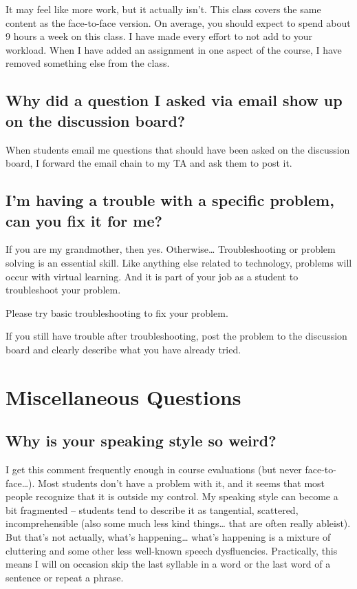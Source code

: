 \documentclass[
]{book}
\begin{document}
It may feel like more work, but it actually isn't. This class covers the same content as the face-to-face version. On average, you should expect to spend about 9 hours a week on this class. I have made every effort to not add to your workload. When I have added an assignment in one aspect of the course, I have removed something else from the class.

\subsection{Why did a question I asked via email show up on the discussion board?}\label{why-did-a-question-i-asked-via-email-show-up-on-the-discussion-board}

When students email me questions that should have been asked on the discussion board, I forward the email chain to my TA and ask them to post it.

\subsection{I'm having a trouble with a specific problem, can you fix it for me?}\label{im-having-a-trouble-with-a-specific-problem-can-you-fix-it-for-me}

If you are my grandmother, then yes. Otherwise\ldots{} Troubleshooting or problem solving is an essential skill. Like anything else related to technology, problems will occur with virtual learning. And it is part of your job as a student to troubleshoot your problem.

Please try basic troubleshooting to fix your problem.

If you still have trouble after troubleshooting, post the problem to the discussion board and clearly describe what you have already tried.

\section{Miscellaneous Questions}\label{nos}

\subsection{Why is your speaking style so weird?}\label{why-is-your-speaking-style-so-weird}

I get this comment frequently enough in course evaluations (but never face-to-face\ldots). Most students don't have a problem with it, and it seems that most people recognize that it is outside my control. My speaking style can become a bit fragmented -- students tend to describe it as tangential, scattered, incomprehensible (also some much less kind things\ldots{} that are often really ableist). But that's not actually, what's happening\ldots{} what's happening is a mixture of cluttering and some other less well-known speech dysfluencies. Practically, this means I will on occasion skip the last syllable in a word or the last word of a sentence or repeat a phrase.
\end{document}
